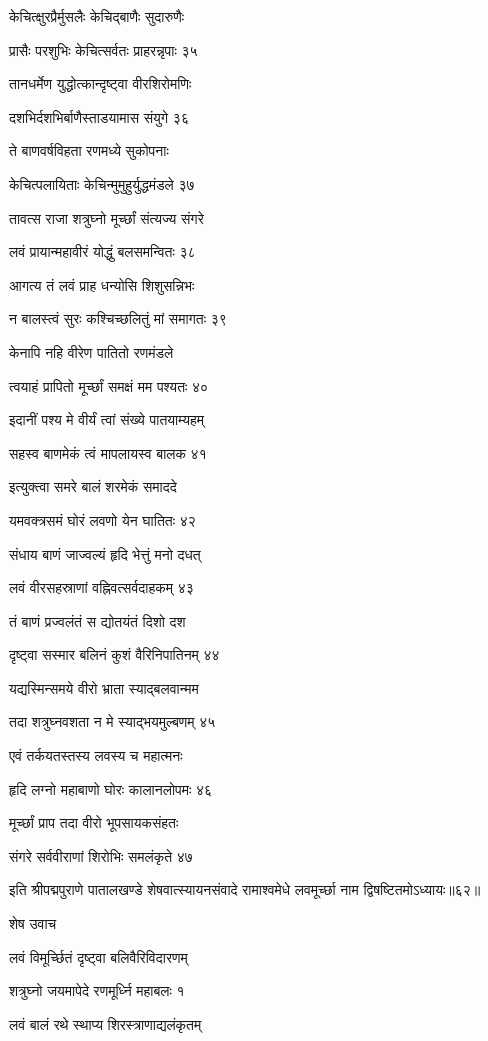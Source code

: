 केचित्क्षुरप्रैर्मुसलैः केचिद्बाणैः सुदारुणैः

प्रासैः परशुभिः केचित्सर्वतः प्राहरन्नृपाः ३५

तानधर्मेण युद्धोत्कान्दृष्ट्वा वीरशिरोमणिः

दशभिर्दशभिर्बाणैस्ताडयामास संयुगे ३६

ते बाणवर्षविहता रणमध्ये सुकोपनाः

केचित्पलायिताः केचिन्मुमुहुर्युद्धमंडले ३७

तावत्स राजा शत्रुघ्नो मूर्च्छां संत्यज्य संगरे

लवं प्रायान्महावीरं योद्धुं बलसमन्वितः ३८

आगत्य तं लवं प्राह धन्योसि शिशुसन्निभः

न बालस्त्वं सुरः कश्चिच्छलितुं मां समागतः ३९

केनापि नहि वीरेण पातितो रणमंडले

त्वयाहं प्रापितो मूर्च्छां समक्षं मम पश्यतः ४०

इदानीं पश्य मे वीर्यं त्वां संख्ये पातयाम्यहम्

सहस्व बाणमेकं त्वं मापलायस्व बालक ४१

इत्युक्त्वा समरे बालं शरमेकं समाददे

यमवक्त्रसमं घोरं लवणो येन घातितः ४२

संधाय बाणं जाज्वल्यं हृदि भेत्तुं मनो दधत्

लवं वीरसहस्राणां वह्निवत्सर्वदाहकम् ४३

तं बाणं प्रज्वलंतं स द्योतयंतं दिशो दश

दृष्ट्वा सस्मार बलिनं कुशं वैरिनिपातिनम् ४४

यद्यस्मिन्समये वीरो भ्राता स्याद्बलवान्मम

तदा शत्रुघ्नवशता न मे स्याद्भयमुल्बणम् ४५

एवं तर्कयतस्तस्य लवस्य च महात्मनः

हृदि लग्नो महाबाणो घोरः कालानलोपमः ४६

मूर्च्छां प्राप तदा वीरो भूपसायकसंहतः

संगरे सर्ववीराणां शिरोभिः समलंकृते ४७

इति श्रीपद्मपुराणे पातालखण्डे शेषवात्स्यायनसंवादे रामाश्वमेधे लवमूर्च्छा नाम द्विषष्टितमोऽध्यायः॥६२॥


शेष उवाच

लवं विमूर्च्छितं दृष्ट्वा बलिवैरिविदारणम्

शत्रुघ्नो जयमापेदे रणमूर्ध्नि महाबलः १

लवं बालं रथे स्थाप्य शिरस्त्राणाद्यलंकृतम्

